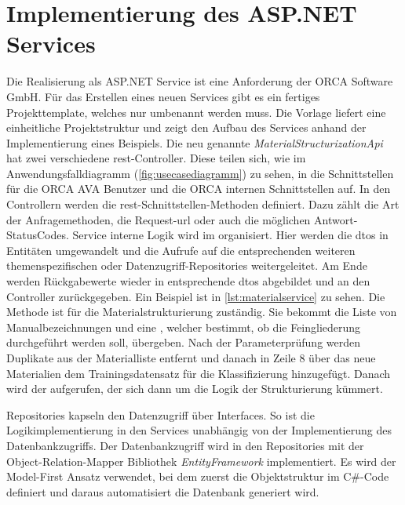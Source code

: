 \section{Implementierung des ASP.NET Services}
\label{c:implementation:service}
Die Realisierung als ASP.NET Service ist eine Anforderung der \glqq ORCA Software GmbH\grqq{}. Für das Erstellen eines neuen Services gibt es ein fertiges Projekttemplate, welches nur umbenannt werden muss. Die Vorlage liefert eine einheitliche Projektstruktur und zeigt den Aufbau des Services anhand der Implementierung eines Beispiels. Die neu genannte \textit{ MaterialStructurizationApi} hat zwei verschiedene \ac{rest}-Controller.
Diese teilen sich, wie im Anwendungsfalldiagramm (\autoref{fig:usecasediagramm}) zu sehen, in die Schnittstellen für die ORCA AVA Benutzer und die ORCA internen Schnittstellen auf. In den Controllern werden die \ac{rest}-Schnittstellen-Methoden definiert. Dazu zählt die Art der Anfragemethoden, die Request-\ac{url} oder auch die möglichen Antwort-StatusCodes. Service interne Logik wird im  organisiert. Hier werden die \acp{dto} in Entitäten umgewandelt und die Aufrufe auf die entsprechenden weiteren themenspezifischen  oder Datenzugriff-Repositories weitergeleitet. Am Ende werden Rückgabewerte wieder in entsprechende \acp{dto} abgebildet und an den Controller zurückgegeben. Ein Beispiel ist in \autoref{lst:materialservice} zu sehen. Die Methode ist für die Materialstrukturierung zuständig. Sie bekommt die Liste von Manualbezeichnungen und eine , welcher bestimmt, ob die Feingliederung durchgeführt werden soll, übergeben. Nach der Parameterprüfung werden Duplikate aus der Materialliste entfernt und danach in Zeile 8 über das  neue Materialien dem Trainingsdatensatz für die Klassifizierung hinzugefügt. Danach wird der  aufgerufen, der sich dann um die Logik der Strukturierung kümmert.

Repositories kapseln den Datenzugriff über Interfaces. So ist die Logikimplementierung in den Services unabhängig von der Implementierung des Datenbankzugriffs. Der Datenbankzugriff wird in den Repositories mit der Object-Relation-Mapper Bibliothek \textit{EntityFramework} implementiert. Es wird der Model-First Ansatz verwendet, bei dem zuerst die Objektstruktur im C\#-Code definiert und daraus automatisiert die Datenbank generiert wird.

